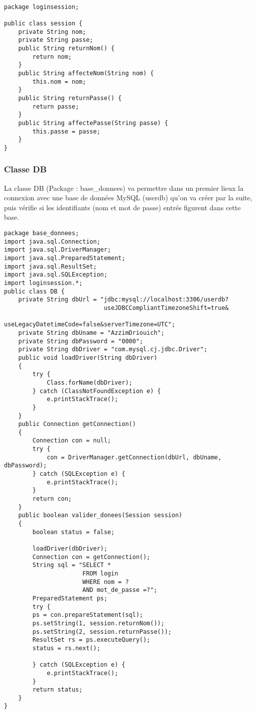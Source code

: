 \documentclass[12]{article}
\begin{document}
\lstset{language=java}
\begin{lstlisting}

package loginsession;

public class session {
	private String nom;
	private String passe;
	public String returnNom() {
		return nom;
	}
	public String affecteNom(String nom) {
		this.nom = nom;
	}
	public String returnPasse() {
		return passe;
	}
	public String affectePasse(String passe) {
		this.passe = passe;
	}
}

\end{lstlisting}

\newpage
\subsubsection{Classe DB}

La classe DB (Package : base\_donnees) va permettre dans un premier lieux la connexion avec une base de données MySQL (userdb) qu'on va créer par la suite, puis vérifie si les identifiants (nom et mot de passe) entrés figurent dans cette base.\\
\lstset{language=java}
\begin{lstlisting}
package base_donnees;
import java.sql.Connection;
import java.sql.DriverManager;
import java.sql.PreparedStatement;
import java.sql.ResultSet;
import java.sql.SQLException;
import loginsession.*;
public class DB {
	private String dbUrl = "jdbc:mysql://localhost:3306/userdb?
                            useJDBCCompliantTimezoneShift=true&
                            useLegacyDatetimeCode=false&serverTimezone=UTC";
	private String dbUname = "AzzimDriouich";
	private String dbPassword = "0000";
	private String dbDriver = "com.mysql.cj.jdbc.Driver";
	public void loadDriver(String dbDriver)
	{
		try {
			Class.forName(dbDriver);
		} catch (ClassNotFoundException e) {
			e.printStackTrace();
		}
	}
	public Connection getConnection()
	{
		Connection con = null;
		try {
			con = DriverManager.getConnection(dbUrl, dbUname, dbPassword);
		} catch (SQLException e) {
			e.printStackTrace();
		}
		return con;
	}
	public boolean valider_donees(Session session)
	{
		boolean status = false;

		loadDriver(dbDriver);
		Connection con = getConnection();
		String sql = "SELECT * 
					  FROM login 
					  WHERE nom = ? 
					  AND mot_de_passe =?";
		PreparedStatement ps;
		try {
		ps = con.prepareStatement(sql);
		ps.setString(1, session.returnNom());
		ps.setString(2, session.returnPasse());
		ResultSet rs = ps.executeQuery();
		status = rs.next();
		
		} catch (SQLException e) {
			e.printStackTrace();
		}
		return status;
	}
}
\end{lstlisting}
\end{document}
